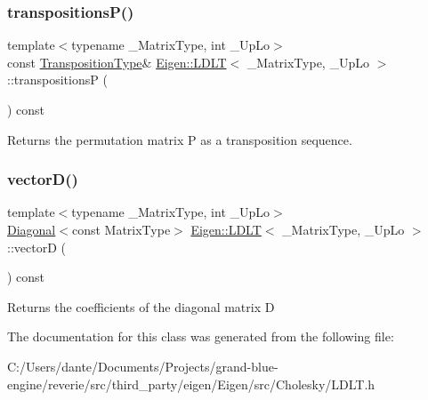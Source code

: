 \subsubsection{\texorpdfstring{transpositionsP()}{transpositionsP()}}
{\footnotesize\ttfamily template$<$typename \+\_\+\+Matrix\+Type, int \+\_\+\+Up\+Lo$>$ \\
const \mbox{\hyperlink{class_eigen_1_1_transpositions}{Transposition\+Type}}\& \mbox{\hyperlink{class_eigen_1_1_l_d_l_t}{Eigen\+::\+L\+D\+LT}}$<$ \+\_\+\+Matrix\+Type, \+\_\+\+Up\+Lo $>$\+::transpositionsP (\begin{DoxyParamCaption}{ }\end{DoxyParamCaption}) const\hspace{0.3cm}{\ttfamily [inline]}}

\begin{DoxyReturn}{Returns}
the permutation matrix P as a transposition sequence. 
\end{DoxyReturn}
\mbox{\label{class_eigen_1_1_l_d_l_t_af60b2f826a38a00070e0efccf0572066}} 
\subsubsection{\texorpdfstring{vectorD()}{vectorD()}}
{\footnotesize\ttfamily template$<$typename \+\_\+\+Matrix\+Type, int \+\_\+\+Up\+Lo$>$ \\
\mbox{\hyperlink{class_eigen_1_1_diagonal}{Diagonal}}$<$const Matrix\+Type$>$ \mbox{\hyperlink{class_eigen_1_1_l_d_l_t}{Eigen\+::\+L\+D\+LT}}$<$ \+\_\+\+Matrix\+Type, \+\_\+\+Up\+Lo $>$\+::vectorD (\begin{DoxyParamCaption}{ }\end{DoxyParamCaption}) const\hspace{0.3cm}{\ttfamily [inline]}}

\begin{DoxyReturn}{Returns}
the coefficients of the diagonal matrix D 
\end{DoxyReturn}


The documentation for this class was generated from the following file\+:\begin{DoxyCompactItemize}
\item 
C\+:/\+Users/dante/\+Documents/\+Projects/grand-\/blue-\/engine/reverie/src/third\+\_\+party/eigen/\+Eigen/src/\+Cholesky/L\+D\+L\+T.\+h\end{DoxyCompactItemize}
